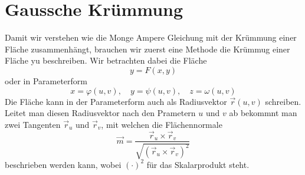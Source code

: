 %
%
%
%
\section{Gaussche Krümmung
\label{mongeampere:section:teil1}}
Damit wir verstehen wie die Monge Ampere Gleichung mit der 
Krümmung einer Fläche zusammenhängt, brauchen wir zuerst eine Methode die 
Krümmug einer Fläche yu beschreiben.
Wir betrachten dabei die Fläche
\begin{equation}
  y = F(x, y)
  \label{mongeampere:area}
\end{equation}
oder in Parameterform
\begin{equation}
  x = \varphi(u,v), \quad y = \psi(u,v), \quad z = \omega(u,v)
  \label{mongeampere:areaparam}
\end{equation}
Die Fläche kann in der Parameterform auch als Radiusvektor $\vec r (u, v)$
schreiben.
Leitet man diesen Radiusvektor nach den Prametern $u$ und $v$ ab bekommnt man zwei Tangenten
$\vec r_u$ und $\vec r_v$,
mit welchen die Flächennormale 
\begin{equation}
  \vec m = \frac{\vec r_u \times \vec r_v}{\sqrt{(\vec r_u \times \vec r_v)^2}} 
  \label{mongeampere:norm}
\end{equation}
beschrieben werden kann, wobei $(\cdot)^2$ für das Skalarprodukt steht.



